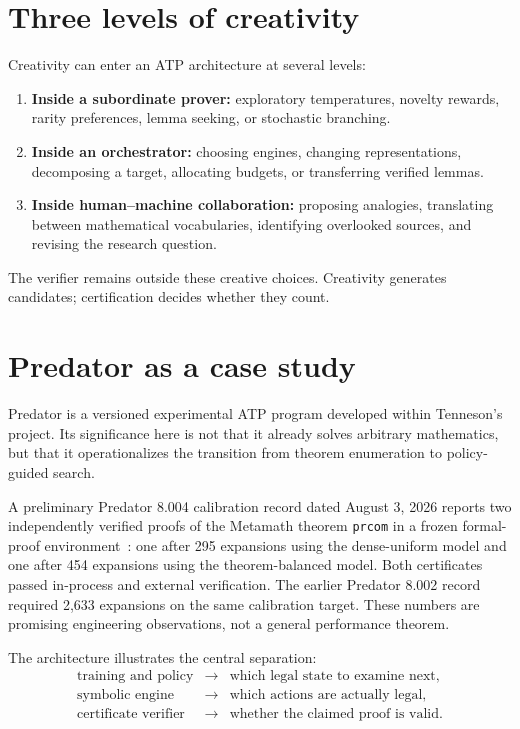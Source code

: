 \documentclass[11pt,oneside]{book}
\theoremstyle{definition}
\theoremstyle{remark}
\begin{document}
\section{Three levels of creativity}
Creativity can enter an ATP architecture at several levels:
\begin{enumerate}
\item \textbf{Inside a subordinate prover:} exploratory temperatures, novelty rewards, rarity preferences, lemma seeking, or stochastic branching.
\item \textbf{Inside an orchestrator:} choosing engines, changing representations, decomposing a target, allocating budgets, or transferring verified lemmas.
\item \textbf{Inside human--machine collaboration:} proposing analogies, translating between mathematical vocabularies, identifying overlooked sources, and revising the research question.
\end{enumerate}
The verifier remains outside these creative choices. Creativity generates candidates; certification decides whether they count.

\section{Predator as a case study}
Predator is a versioned experimental ATP program developed within Tenneson's project. Its significance here is not that it already solves arbitrary mathematics, but that it operationalizes the transition from theorem enumeration to policy-guided search.

A preliminary Predator 8.004 calibration record dated August 3, 2026 reports two independently verified proofs of the Metamath theorem \texttt{prcom} in a frozen formal-proof environment~\cite{metamath, predator8004}: one after 295 expansions using the dense-uniform model and one after 454 expansions using the theorem-balanced model. Both certificates passed in-process and external verification. The earlier Predator 8.002 record required 2,633 expansions on the same calibration target. These numbers are promising engineering observations, not a general performance theorem.

The architecture illustrates the central separation:
\[
\begin{array}{rcl}
\text{training and policy} &\longrightarrow& \text{which legal state to examine next},\\
\text{symbolic engine} &\longrightarrow& \text{which actions are actually legal},\\
\text{certificate verifier} &\longrightarrow& \text{whether the claimed proof is valid}.
\end{array}
\]
\end{document}
